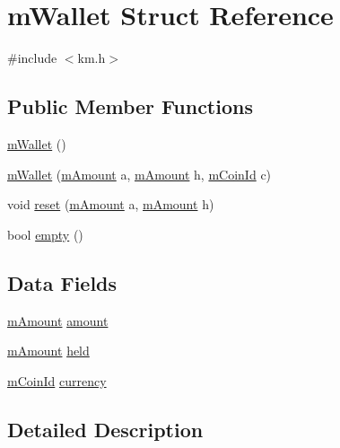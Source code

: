 \hypertarget{struct_k_1_1m_wallet}{}\section{m\+Wallet Struct Reference}
\label{struct_k_1_1m_wallet}


{\ttfamily \#include $<$km.\+h$>$}

\subsection*{Public Member Functions}
\begin{DoxyCompactItemize}
\item 
\hyperlink{struct_k_1_1m_wallet_a97ad90c2a76dabc6504f1317490bb2b9}{m\+Wallet} ()
\item 
\hyperlink{struct_k_1_1m_wallet_a1e8eab2393719ed37777cc3372044d80}{m\+Wallet} (\hyperlink{km_8h_ad4d00888c55a47a8a40ed8020d176086}{m\+Amount} a, \hyperlink{km_8h_ad4d00888c55a47a8a40ed8020d176086}{m\+Amount} h, \hyperlink{km_8h_a0299927fb26276a1e0f4c2b4dedb698e}{m\+Coin\+Id} c)
\item 
void \hyperlink{struct_k_1_1m_wallet_a853c23fdf7cba1e1005c5b59769642ba}{reset} (\hyperlink{km_8h_ad4d00888c55a47a8a40ed8020d176086}{m\+Amount} a, \hyperlink{km_8h_ad4d00888c55a47a8a40ed8020d176086}{m\+Amount} h)
\item 
bool \hyperlink{struct_k_1_1m_wallet_a3f37b042a1e7cd4bd38fc564de81f0da}{empty} ()
\end{DoxyCompactItemize}
\subsection*{Data Fields}
\begin{DoxyCompactItemize}
\item 
\hyperlink{km_8h_ad4d00888c55a47a8a40ed8020d176086}{m\+Amount} \hyperlink{struct_k_1_1m_wallet_a45ae71aeec90c6a39f4ba8187ae01345}{amount}
\item 
\hyperlink{km_8h_ad4d00888c55a47a8a40ed8020d176086}{m\+Amount} \hyperlink{struct_k_1_1m_wallet_a9b5165456071402b08d8b71ce5c2e9d0}{held}
\item 
\hyperlink{km_8h_a0299927fb26276a1e0f4c2b4dedb698e}{m\+Coin\+Id} \hyperlink{struct_k_1_1m_wallet_a216d44ca9942257997747da567464473}{currency}
\end{DoxyCompactItemize}


\subsection{Detailed Description}


